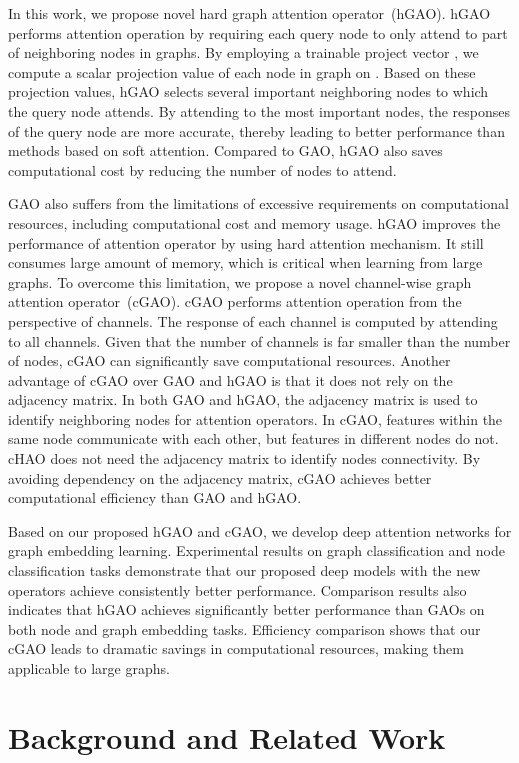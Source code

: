 \documentclass[sigconf]{acmart}
\begin{document}
In this work, we propose novel hard graph attention operator~(hGAO).
hGAO performs attention operation by requiring each query node to
only attend to part of neighboring nodes in graphs. By employing a
trainable project vector , we compute a scalar
projection value of each node in graph on . Based on
these projection values, hGAO selects several important neighboring
nodes to which the query node attends. By attending to the most
important nodes, the responses of the query node are more accurate,
thereby leading to better performance than methods based on soft
attention. Compared to GAO, hGAO also saves computational cost by
reducing the number of nodes to attend.


GAO also suffers from the limitations of excessive requirements on
computational resources, including computational cost and memory
usage. hGAO improves the performance of attention operator by using
hard attention mechanism. It still consumes large amount of memory,
which is critical when learning from large graphs. To overcome this
limitation, we propose a novel channel-wise graph attention
operator~(cGAO). cGAO performs attention operation from the
perspective of channels. The response of each channel is computed by
attending to all channels. Given that the number of channels is far
smaller than the number of nodes, cGAO can significantly save
computational resources. Another advantage of cGAO over GAO and hGAO
is that it does not rely on the adjacency matrix. In both GAO and
hGAO, the adjacency matrix is used to identify neighboring nodes for
attention operators. In cGAO, features within the same node
communicate with each other, but features in different nodes do not.
cHAO does not need the adjacency matrix to identify nodes
connectivity. By avoiding dependency on the adjacency matrix, cGAO
achieves better computational efficiency than GAO and hGAO.

Based on our proposed hGAO and cGAO, we develop deep attention
networks for graph embedding learning. Experimental results on graph
classification and node classification tasks demonstrate that our
proposed deep models with the new operators achieve consistently
better performance. Comparison results also indicates that hGAO
achieves significantly better performance than GAOs on both node and
graph embedding tasks. Efficiency comparison shows that our cGAO
leads to dramatic savings in computational resources, making them
applicable to large graphs.


\section{Background and Related Work}\label{sec:relatedwork}
\end{document}
